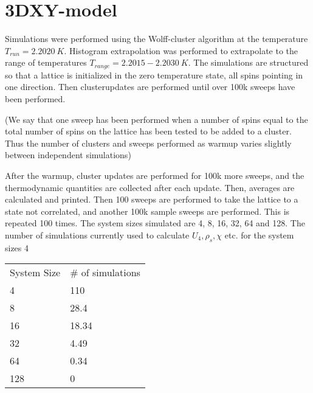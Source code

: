 \documentclass[a4paper]{article}
\begin{document}
\section{3DXY-model}
Simulations were performed using the Wolff-cluster algorithm at the temperature $T_{run} = 2.2020~K$. Histogram extrapolation was performed to extrapolate to the range of temperatures $T_{range} = 2.2015-2.2030 ~ K$.
The simulations are structured so that a lattice is initialized in the zero temperature state, all spins pointing in one direction. Then clusterupdates are performed until over 100k sweeps have been performed.

(We say that one sweep has been performed when a number of spins equal to the total number of spins on the lattice has been tested to be added to a cluster.
Thus the number of clusters and sweeps performed as warmup varies slightly between independent simulations)

After the warmup, cluster updates are performed for 100k more sweeps, and the thermodynamic quantities are collected after each update. Then, averages are calculated and printed. Then 100 sweeps are performed to take the lattice to a state not correlated, and another 100k sample sweeps are performed. This is repeated 100 times. The system sizes simulated are 4, 8, 16, 32, 64 and 128. 
The number of simulations currently used to calculate $U_4, \rho_s, \chi $ etc. for the system sizes 4


\begin{tabular}{l l }
  System Size & # of simulations\\
  4 & 110 \\
  8 & 28.4 \\
  16 & 18.34 \\
  32 & 4.49 \\
  64 & 0.34 \\
  128 & 0 \\
\end{tabular}
\end{document}
